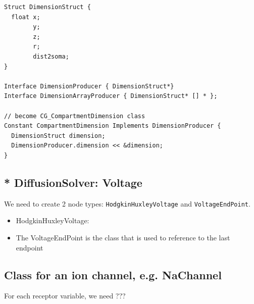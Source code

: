 \begin{verbatim}
Struct DimensionStruct {
  float x;
        y;
        z;
        r;
        dist2soma;
}

Interface DimensionProducer { DimensionStruct*}
Interface DimensionArrayProducer { DimensionStruct* [] * };

// become CG_CompartmentDimension class
Constant CompartmentDimension Implements DimensionProducer {
  DimensionStruct dimension;
  DimensionProducer.dimension << &dimension;
}
\end{verbatim}


\subsection{* DiffusionSolver: Voltage}

We need to create 2 node types: \verb!HodgkinHuxleyVoltage! and 
\verb!VoltageEndPoint!. 
\begin{itemize}
  \item HodgkinHuxleyVoltage: 
  \item The VoltageEndPoint is the class that is used to reference to the last
  endpoint
\end{itemize} 



\subsection{Class for an ion channel, e.g. NaChannel}
\label{sec:NaChannel.mdl}

For each receptor variable, we need ???


